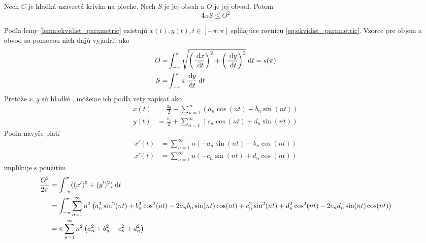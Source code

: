 \begin{veta}
Nech $C$ je hladká uzavretá krivka na ploche. Nech $S$ je jej obsah a $O$ je
jej obvod. Potom
    \begin{equation}
      4\pi S \le O^2
    \end{equation}
\end{veta}

\begin{dokaz}
    Podľa lemy \ref{lema:ekvidist_parametric} existujú
    $x(t),y(t), t\in[-\pi,\pi]$ spĺňajúce rovnicu
    \ref{eq:ekvidist_parametric}.
    Vzorce pre objem a obvod sa pomocou nich dajú vyjadriť ako
    \begin{align}        
        O =& \int_{-\pi}^{\pi} \sqrt{\left(\frac{\; \mathrm{d} x}{\; \mathrm{d} t} \right)^2 +
            \left(\frac{\; \mathrm{d} y}{\; \mathrm{d} t} \right)^2} \; \mathrm{d} t = s(\pi) \\
        S =& \int_{-\pi}^{\pi} x \frac{\; \mathrm{d} y}{\; \mathrm{d} t} \; \mathrm{d} t    
    \end{align}
    Pretože $x,y$ sú hladké , môžeme
    ich podľa vety 
    zapísať ako
    \begin{align}
        x(t) &= \frac{a_0}{2} + \sum_{n=1}^{\infty} \left(
               a_n \cos(n t) + b_n \sin(n t) \right) \\
        y(t) &= \frac{c_0}{2} + \sum_{n=1}^{\infty} \left(
               c_n \cos(n t) + d_n \sin(n t) \right)
    \end{align}
    Podľa  navyše platí
    \begin{align}
        x'(t) &= \sum_{n=1}^{\infty} n \left(
            -a_n \sin(nt) + b_n \cos(n t) \right) \\
        x'(t) &= \sum_{n=1}^{\infty} n \left(
            -c_n \sin(nt) + d_n \cos(n t) \right)
    \end{align}
     implikuje s použitím
    \begin{equation}
    \begin{split}
        \frac{O^2}{2\pi} &= \intpipi ((x')^2 + (y')^2) \dd t \\
        &=
        \intpipi \sum_{n=1}^{\infty} n^2 \left(
            a_n ^2 \sin^2(nt)+ b_n^2 \cos^2(nt)
            -2 a_n b_n \sin(nt) \cos(nt) +
            c_n ^2 \sin^2(nt)+ d_n^2 \cos^2(nt)
            -2 c_n d_n \sin(nt) \cos(nt) \right) \\
        &= \pi \sum_{n=1}^\infty n^2 \left( a_n^2 + b_n^2 + 
            c_n^2 + d_n^2 \right)

\end{split}
\end{equation}
\end{dokaz}

